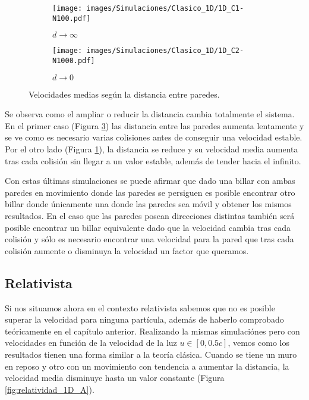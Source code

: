 \documentclass[11pt, spanish]{book}
\begin{document}
\begin{figure}[H]
    \begin{subfigure}[b]{0.5\textwidth}
        \centering
        \texttt{[image: images/Simulaciones/Clasico\_1D/1D\_C1-N100.pdf]}
        \caption{$d \rightarrow \infty$}
        \label{fig:clasico_distancia_infinito}
    \end{subfigure}
    \hfill
    \begin{subfigure}[b]{0.5\textwidth}
        \centering
        \texttt{[image: images/Simulaciones/Clasico\_1D/1D\_C2-N1000.pdf]}
        \caption{$d \rightarrow 0$}
        \label{fig:clasico_distancia_cero}
    \end{subfigure}
    \caption{Velocidades medias según la distancia entre paredes.}
\end{figure}

Se observa como el ampliar o reducir la distancia cambia totalmente el sistema. En el primer caso (Figura \ref{fig:clasico_distancia_cero}) las distancia entre las paredes aumenta lentamente y se ve como es necesario varias colisiones antes de conseguir una velocidad estable. Por el otro lado (Figura \ref{fig:clasico_distancia_infinito}), la distancia se reduce y su velocidad media aumenta tras cada colisión sin llegar a un valor estable, además de tender hacia el infinito. 

\vspace{3mm}

Con estas últimas simulaciones se puede afirmar que dado una billar con ambas paredes en movimiento donde las paredes se persiguen es posible encontrar otro billar donde únicamente una donde las paredes sea móvil y obtener los mismos resultados. En el caso que las paredes posean direcciones distintas también será posible encontrar un billar equivalente dado que la velocidad cambia tras cada colisión y sólo es necesario encontrar una velocidad para la pared que tras cada colisión aumente o disminuya la velocidad un factor que queramos. 

\subsection{Relativista}

Si nos situamos ahora en el contexto relativista sabemos que no es posible superar la velocidad para ninguna partícula, además de haberlo comprobado teóricamente en el capítulo anterior. Realizando la mismas simulaciónes pero con velocidades en función de la velocidad de la luz \( u \in [0, 0.5c] \), vemos como los resultados tienen una forma similar a la teoría clásica. Cuando se tiene un muro en reposo y otro con un movimiento con tendencia a aumentar la distancia, la velocidad media disminuye hasta un valor constante (Figura \ref{fig:relatividad_1D_A}). 
\end{document}
